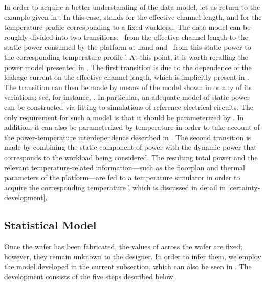 In order to acquire a better understanding of the data model, let us return to
the example given in . In this case, \g stands for the
effective channel length, and \h for the temperature profile \mq corresponding
to a fixed workload. The data model can be roughly divided into two transitions:
\one~from the effective channel length \g to the static power consumed by the
platform at hand and \two~from this static power to the corresponding
temperature profile \h. At this point, it is worth recalling the power model
presented in . The first transition is due to the dependence
of the leakage current on the effective channel length, which is implicitly
present in . The transition can then be made by means of the
model shown in  or any of its variations; see, for instance,
\cite{chandrakasan2000, srivastava2010, yang2010, juan2012}. In particular, an
adequate model of static power can be constructed via fitting to 
simulations of reference electrical circuits. The only requirement for such a
model is that it should be parameterized by \g. In addition, it can also be
parameterized by temperature in order to take account of the power-temperature
interdependence described in . The second transition is made
by combining the static component of power with the dynamic power that
corresponds to the workload being considered. The resulting total power and the
relevant temperature-related information---such as the floorplan and thermal
parameters of the platform---are fed to a temperature simulator in order to
acquire the corresponding temperature \h, which is discussed in detail in
\cref{certainty-development}.

\subsection{Statistical Model}

Once the wafer has been fabricated, the values of \g across the wafer are fixed;
however, they remain unknown to the designer. In order to infer them, we employ
the model developed in the current subsection, which can also be seen in
. The development consists of the five steps
described below.

